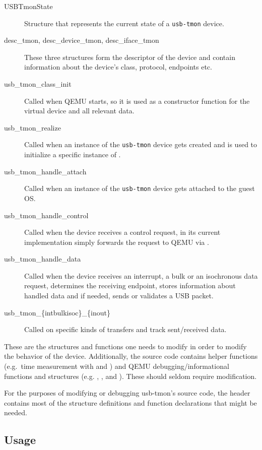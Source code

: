 \begin{description}
	\item[USBTmonState]
		Structure that represents the current state of a \texttt{usb-tmon}
		device.
	\item[desc\_tmon, desc\_device\_tmon, desc\_iface\_tmon]
		These three structures form the descriptor of the device and contain
		information about the device's class, protocol, endpoints etc.
	\item[usb\_tmon\_class\_init]
		Called when QEMU starts, so it is used as a constructor function for the
		virtual device and all relevant data.
	\item[usb\_tmon\_realize]
		Called when an instance of the \texttt{usb-tmon} device gets created and
		is used to initialize a specific instance of .
	\item[usb\_tmon\_handle\_attach]
		Called when an instance of the \texttt{usb-tmon} device gets attached to
		the guest OS.
	\item[usb\_tmon\_handle\_control]
		Called when the device receives a control request, in its current
		implementation simply forwards the request to QEMU via
		.
	\item[usb\_tmon\_handle\_data]
		Called when the device receives an interrupt, a bulk or an isochronous
		data request, determines the receiving endpoint, stores information
		about handled data and if needed, sends or validates a USB packet.
	\item[usb\_tmon\_\{int\textbar bulk\textbar isoc\}\_\{in\textbar out\}]
		Called on specific kinds of transfers and track sent/received data.
\end{description}

These are the structures and functions one needs to modify in order to modify
the behavior of the device. Additionally, the source code contains helper
functions (e.g.\ time measurement with  and )
and QEMU debugging/informational functions and structures (e.g.
, ,  and
). These should seldom require modification.

For the purposes of modifying or debugging usb-tmon's source code, the header
 contains most of the structure definitions
and function declarations that might be needed.

\subsection{Usage}

